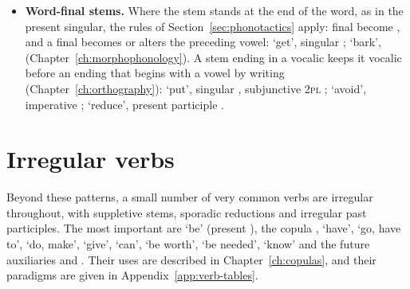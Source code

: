 \begin{itemize}
    \item \textbf{Word-final stems.} Where the stem stands at the end of the word, as in the present singular, the rules of Section~\ref{sec:phonotactics} apply: final  become , and a final  becomes  or alters the preceding vowel:  `get', singular ;  `bark',  (Chapter~\ref{ch:morphophonology}). A stem ending in a vocalic  keeps it vocalic before an ending that begins with a vowel by writing  (Chapter~\ref{ch:orthography}):   `put', singular  , subjunctive 2\textsc{pl}  ;  `avoid', imperative ;  `reduce', present participle .
\end{itemize}

\section{Irregular verbs}\label{sec:irregular-verbs}
Beyond these patterns, a small number of very common verbs are irregular throughout, with suppletive stems, sporadic reductions and irregular past participles. The most important are  `be' (present ), the copula ,  `have',  `go, have to',  `do, make',  `give',  `can',  `be worth',  `be needed',  `know' and the future auxiliaries  and . Their uses are described in Chapter~\ref{ch:copulas}, and their paradigms are given in Appendix~\ref{app:verb-tables}.
